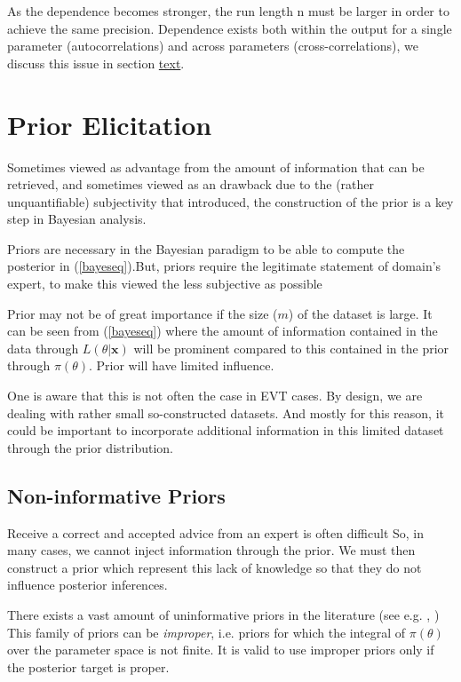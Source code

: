 As the dependence becomes stronger, the run length n must be larger in order
to achieve the same precision. Dependence exists both within the output for a single parameter
(autocorrelations) and across parameters (cross-correlations), we discuss this issue in section \hyperref[label]{text}.




\section{Prior Elicitation}

Sometimes viewed as advantage from the amount of information that can be retrieved, and sometimes viewed as an drawback due to the (rather unquantifiable) subjectivity that introduced, the construction of the prior is a key step in Bayesian analysis.


Priors are necessary in the Bayesian paradigm to be able to compute the posterior in  (\ref{bayeseq}).But, priors require the legitimate statement of domain's expert, to make this viewed the less subjective as possible

Prior may not be of great importance if the size ($m$) of the dataset is large. It can be seen from (\ref{bayeseq}) where the amount of information contained in the data through $L(\theta|\boldsymbol{x})$ will be prominent compared to this contained in the prior through $\pi(\theta)$. Prior will have limited influence.

One is aware that this is not often the case in EVT cases. By design, we are dealing with rather small so-constructed datasets. And mostly for this reason, it could be important to incorporate additional information in this limited dataset through the prior distribution.

\subsection{Non-informative Priors}

Receive a correct and accepted advice from an expert is often difficult
So, in many cases, we cannot inject information through the prior. 
We must then construct a prior which represent this lack of knowledge so that  they do not influence posterior inferences. 

There exists a vast amount of uninformative priors in the literature (see e.g. \cite{yang_catalog_1996}, \cite{ni_noninformative_2003})
This family of priors can be \emph{improper}, i.e. priors for which the integral of $\pi(\theta)$ over the parameter space is not finite. It is valid to use improper priors only if the posterior target is proper. 

